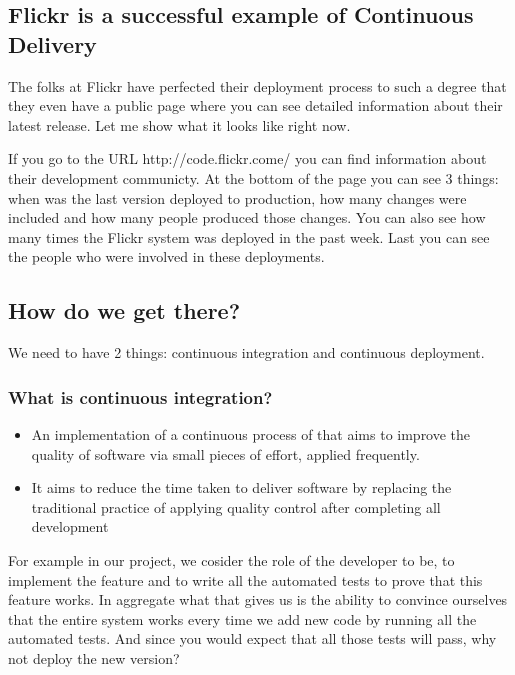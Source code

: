 \documentclass{article}
\begin{document}
\subsection{Flickr is a successful example of Continuous Delivery}

The folks at Flickr have perfected their deployment process to such a
degree that they even have a public page where you can see detailed
information about their latest release.
%
Let me show what it looks like right now.

If you go to the URL http://code.flickr.come/ you can find information
about their development communicty.
%
At the bottom of the page you can see 3 things: when was the last
version deployed to production, how many changes were included and how
many people produced those changes.
%
You can also see how many times the Flickr system was deployed in the
past week.
%
Last you can see the people who were involved in these deployments.



\subsection{How do we get there?}

We need to have 2 things: continuous integration and continuous
deployment.

\subsubsection*{What is continuous integration?}
\begin{itemize}
  \item An implementation of a continuous process of that aims to
    improve the quality of software via small pieces of effort,
    applied frequently.
  \item It aims to reduce the time taken to deliver software by
    replacing the traditional practice of applying quality control
    after completing all development
\end{itemize}

For example in our project, we cosider the role of the developer to
be, to implement the feature and to write all the automated tests to
prove that this feature works.
%
In aggregate what that gives us is the ability to convince ourselves
that the entire system works every time we add new code by running all
the automated tests.
%
And since you would expect that all those tests will pass, why not
deploy the new version?
\end{document}
